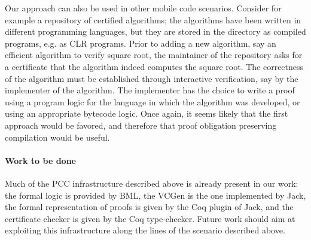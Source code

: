 Our approach can also be used in other mobile code scenarios. Consider
for example a repository of certified algorithms; the algorithms have
been written in different programming languages, but they are stored
in the directory as compiled programs, e.g. as CLR programs. Prior to
adding a new algorithm, say an efficient algorithm to verify square
root, the maintainer of the repository asks for a certificate that the
algorithm indeed computes the square root. The correctness of the
algorithm must be established through interactive verification, say by
the implementer of the algorithm. The implementer has the choice to
write a proof using a program logic for the language in which the
algorithm was developed, or using an appropriate bytecode logic. Once
again, it seems likely that the first approach would be favored, and
therefore that proof obligation preserving compilation would be
useful.


\paragraph{Work to be done}
Much of the PCC infrastructure described above is already present
in our work: the formal logic is provided by BML, the VCGen is the
one implemented by Jack, the formal representation of proofs is
given by the Coq plugin of Jack, and the certificate checker is
given by the Coq type-checker. Future work should aim at exploiting
this infrastructure along the lines of the scenario described above.
